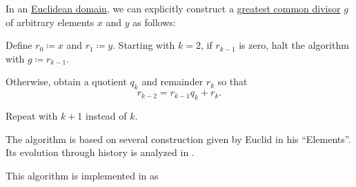 \begin{algorithm}\label{alg:euclidean_algorithm}
  In an \hyperref[def:euclidean_domain]{Euclidean domain}, we can explicitly construct a \hyperref[def:gcd]{greatest common divisor} \( g \) of arbitrary elements \( x \) and \( y \) as follows:
  \begin{thmenum}
     Define \( r_0 \coloneqq x \) and \( r_1 \coloneqq y \).
     Starting with \( k = 2 \), if \( r_{k-1} \) is zero, halt the algorithm with \( g \coloneqq r_{k-1} \).

    Otherwise, obtain a quotient \( q_k \) and remainder \( r_k \) so that
    \begin{equation*}
      r_{k-2} = r_{k-1} q_k + r_k.
    \end{equation*}

    Repeat  with \( k + 1 \) instead of \( k \).
  \end{thmenum}
\end{algorithm}
\begin{comments}
  \item The algorithm is based on several construction given by Euclid in his \enquote{Elements}. Its evolution through history is analyzed in \cite[ch. II.4]{GowersEtAl2008PrincetonCompanion}.

  \item This algorithm is implemented in \cite{notebook:code} as
  \begin{CodeRefDisplay}
  \end{CodeRefDisplay}
\end{comments}
